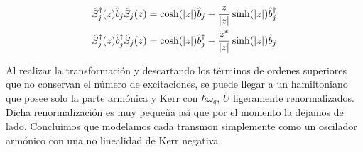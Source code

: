 \begin{subequations}
\begin{align}
    \hat S_j^\dag(z) \hat b_j \hat S_j(z) &= \cosh(\abs{z})\hat b_j -\frac{z}{\abs{z}}\sinh(\abs{z})\hat b^\dag_j\\
    \hat S_j^\dag(z) \hat b_j^\dag \hat S_j(z) &= \cosh(\abs{z})\hat b_j^\dag -\frac{z^*}{\abs{z}}\sinh(\abs{z})\hat b_j
\end{align}\label{eq:squeeze_transformations}
\end{subequations}

Al realizar la transformación y descartando los términos de ordenes superiores que no conservan el número de excitaciones, se puede llegar a un hamiltoniano que posee solo la parte armónica y Kerr con $\hbar \omega_q$, $U$ ligeramente renormalizados. Dicha renormalización es muy pequeña así que por el momento la dejamos de lado.  Concluimos que modelamos cada transmon simplemente como un oscilador armónico con una no linealidad de Kerr negativa.\\

